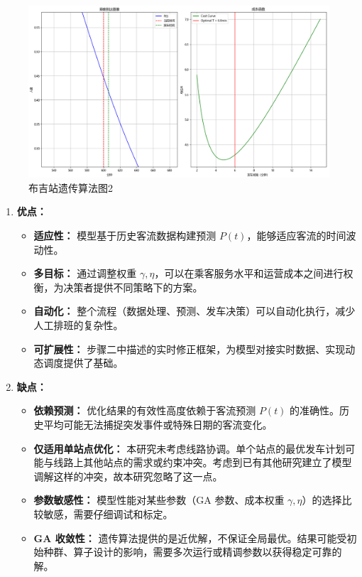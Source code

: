 \begin{figure}[htbp]
    \centering
    \includegraphics[width=1.0\textwidth]{res/Figure_8.png}
    \caption{布吉站遗传算法图2}
    \label{fig:gaBuji2}
\end{figure}


\begin{enumerate}
    \item \textbf{优点：}
        \begin{itemize}
            \item \textbf{适应性：} 模型基于历史客流数据构建预测 $P(t)$，能够适应客流的时间波动性。
            \item \textbf{多目标：} 通过调整权重 $\gamma, \eta$，可以在乘客服务水平和运营成本之间进行权衡，为决策者提供不同策略下的方案。
            \item \textbf{自动化：} 整个流程（数据处理、预测、发车决策）可以自动化执行，减少人工排班的复杂性。
            \item \textbf{可扩展性：} 步骤二中描述的实时修正框架，为模型对接实时数据、实现动态调度提供了基础。
        \end{itemize}
    \item \textbf{缺点：}
        \begin{itemize}
            \item \textbf{依赖预测：} 优化结果的有效性高度依赖于客流预测 $P(t)$ 的准确性。历史平均可能无法捕捉突发事件或特殊日期的客流变化。
            \item \textbf{仅适用单站点优化：} 本研究未考虑线路协调。单个站点的最优发车计划可能与线路上其他站点的需求或约束冲突。考虑到已有其他研究建立了模型调解这样的冲突，故本研究忽略了这一点。
            \item \textbf{参数敏感性：} 模型性能对某些参数（GA 参数、成本权重 $\gamma, \eta$）的选择比较敏感，需要仔细调试和标定。
            \item \textbf{GA 收敛性：} 遗传算法提供的是近优解，不保证全局最优。结果可能受初始种群、算子设计的影响，需要多次运行或精调参数以获得稳定可靠的解。
        \end{itemize}
\end{enumerate}

